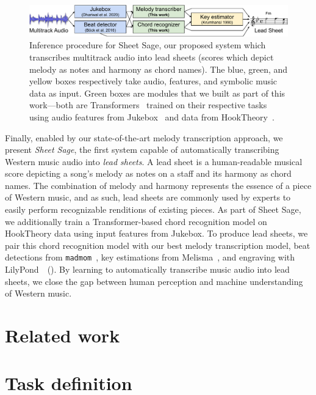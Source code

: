 \documentclass{article}
\newcommand{\madmom}{\texttt{madmom}}
\newcommand{\hooktheory}{HookTheory}
\newcommand{\sheetsage}{Sheet Sage}
\begin{document}
\begin{figure}
    \centering
    \includegraphics[width=\linewidth]{figs/sheet_sage.pdf}
    \caption{Inference procedure for Sheet Sage, our proposed system which transcribes multitrack audio into lead sheets (scores which depict melody as notes and harmony as chord names). The blue, green, and yellow boxes respectively take audio, features, and symbolic music data as input. Green boxes are modules that we built as part of this work---both are Transformers~\cite{vaswani2017attention} trained on their respective tasks using audio features from Jukebox~\cite{dhariwal2020jukebox} and data from \hooktheory~\cite{hooktheory}.}
    \label{fig:sheet_sage}
\end{figure}

Finally, enabled by our state-of-the-art melody transcription approach, we present \emph{\sheetsage}, the first system capable of automatically transcribing Western music audio into \emph{lead sheets}. 
A lead sheet is a human-readable musical score depicting a song's melody as notes on a staff and its harmony as chord names.
The combination of melody and harmony represents the essence of a piece of Western music, and as such, lead sheets are commonly used by experts to easily perform recognizable renditions of existing pieces. 
As part of \sheetsage, we additionally train a Transformer-based chord recognition model on \hooktheory{} data using input features from Jukebox. 
To produce lead sheets, we pair this chord recognition model with our best melody transcription model, beat detections from \madmom~\cite{bock2016madmom,bock2016joint}, key estimations from Melisma~\cite{krumhansl1990cognitive,temperley1999key,sleator2001melisma}, and engraving with LilyPond~\cite{nienhuys2003lilypond}~(). 
By learning to automatically transcribe music audio into lead sheets, we close the gap between human perception and machine understanding of Western music.

\section{Related work}


\section{Task definition}
\end{document}
